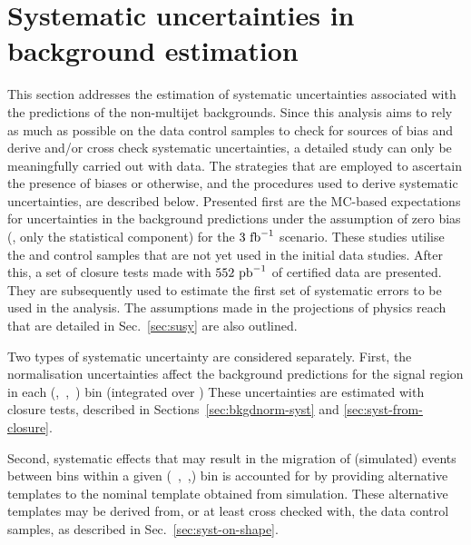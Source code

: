 \section{Systematic uncertainties in background estimation}
\label{sec:systematics}

This section addresses the estimation of systematic uncertainties
associated with the predictions of the non-multijet backgrounds. Since
this analysis aims to rely as much as possible on the data control
samples to check for sources of bias and derive and/or cross check
systematic uncertainties, a detailed study can only be meaningfully
carried out with data. The strategies that are employed to
ascertain the presence of biases or otherwise, and the procedures used
to derive systematic uncertainties, are described below. Presented
first are the MC-based
expectations for uncertainties in the background predictions under the
assumption of zero bias (\ie, only the statistical component) for the
$3~\ifb$ scenario. %
These studies utilise the
\ej and \eej control samples that are not yet used in the initial
data studies. After this, a set of closure tests made with $552~\ipb$ of certified
data are presented. They are subsequently used to estimate the first
set of systematic errors to be used in the analysis. The assumptions made in 
the projections of physics reach
that are detailed in Sec.~\ref{sec:susy} are also outlined.

Two types of systematic uncertainty are considered separately. First,
the normalisation uncertainties affect the background predictions for
the signal region in each (\nb,~\njet,~\scalht) bin (integrated over \mht)
These uncertainties are estimated with closure tests, described in
Sections~\ref{sec:bkgdnorm-syst} and \ref{sec:syst-from-closure}.

Second, systematic effects that may result in the migration of
(simulated) events between \mht bins within a given (\njet~,\nb~,\scalht)
bin is accounted for by providing alternative templates to the nominal
\mht template obtained from simulation. These alternative \mht
templates may be derived from, or at least cross checked with, the
data control samples, as described in Sec.~\ref{sec:syst-on-shape}.

